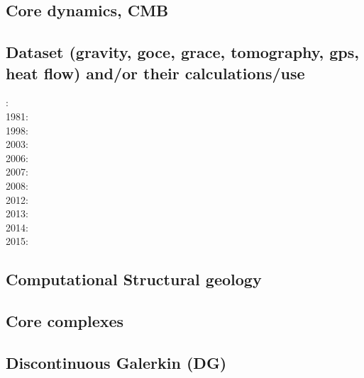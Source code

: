 \subsection*{Core dynamics, CMB}

\noindent
\cite{hayu96}
\cite{lahb08}\cite{gost08}

\subsection*{Dataset (gravity, goce, grace, tomography, gps, heat flow) 
and/or their calculations/use}

: \cite{rola77}\\
1981: \cite{dzan81}\\
1998: \cite{bisp98}\\
2003: \cite{krhh03}\cite{sosi03}\\
2006: \cite{masr06}\\
2007: \cite{mitk07}\\
2008: \cite{zhou08}\cite{zhou08}\\
2012: \cite{hawj12}\cite{resa12}\cite{hawj12}\cite{fesw12}\\
2013: \cite{ress13}\cite{ebbf13}\cite{davi13}\\
2014: \cite{paml14}\cite{ebbf14}\cite{krbk14}\\
2015: \cite{boem15}\cite{brrs15}

\subsection*{Computational Structural geology}

\noindent
\cite{fige95}
\cite{acgf00}
\cite{trla00}
\cite{masc01}
\cite{manc08}
\cite{frem11}
\cite{naam17}


\subsection*{Core complexes}

\noindent
\cite{lehm12}

\subsection*{Discontinuous Galerkin (DG)}

